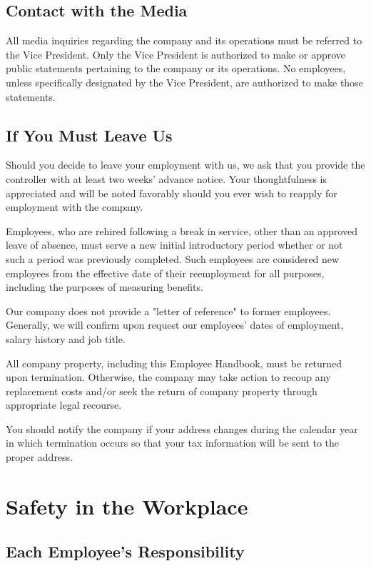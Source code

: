 \subsection{Contact with the Media}

All media inquiries regarding the company and its operations must be referred to the Vice President. Only the Vice President is authorized to make or approve public statements pertaining to the company or its operations. No employees, unless specifically designated by the Vice President, are authorized to make those statements.

\subsection{If You Must Leave Us}

Should you decide to leave your employment with us, we ask that you provide the controller with at least two weeks' advance notice. Your thoughtfulness is appreciated and will be noted favorably should you ever wish to reapply for employment with the company.

Employees, who are rehired following a break in service, other than an approved leave of absence, must serve a new initial introductory period whether or not such a period was previously completed. Such employees are considered new employees from the effective date of their reemployment for all purposes, including the purposes of measuring benefits.

Our company does not provide a "letter of reference" to former employees. Generally, we will confirm upon request our employees' dates of employment, salary history and job title.

All company property, including this Employee Handbook, must be returned upon termination. Otherwise, the company may take action to recoup any replacement costs and/or seek the return of company property through appropriate legal recourse.

You should notify the company if your address changes during the calendar year in which termination occurs so that your tax information will be sent to the proper address.

\section{Safety in the Workplace}

\subsection{Each Employee's Responsibility}

